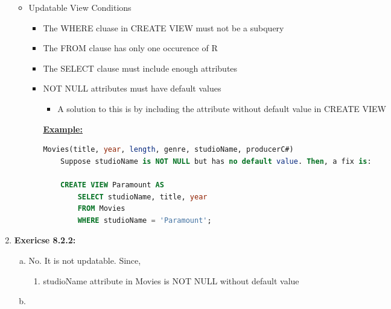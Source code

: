 \documentclass[12pt]{article}
\begin{document}
\begin{enumerate}[1.]
    \begin{itemize}
        \item Updatable View Conditions
        \begin{itemize}
            \item The WHERE cluase in CREATE VIEW must not be a subquery
            \item The FROM clause has only one occurence of R
            \item The SELECT clause must include enough attributes
            \item NOT NULL attributes must have default values
            \begin{itemize}
                \item A solution to this is by including the attribute without
                default value in CREATE VIEW
            \end{itemize}

            \bigskip

            \underline{\textbf{Example:}}

            \bigskip

    \begin{lstlisting}[language=SQL]
    Movies(title, year, length, genre, studioName, producerC#)
    Suppose studioName is NOT NULL but has no default value. Then, a fix is:

    CREATE VIEW Paramount AS
        SELECT studioName, title, year
        FROM Movies
        WHERE studioName = 'Paramount';
    \end{lstlisting}

        \end{itemize}
    \end{itemize}

    \bigskip

    \item \textbf{Exericse 8.2.2:}

    \bigskip

    \begin{enumerate}[a)]
        \item No. It is not updatable. Since,

        \begin{enumerate}[1.]
            \item studioName attribute in Movies is NOT NULL without default value
        \end{enumerate}

        \item


\end{enumerate}
\end{enumerate}
\end{document}
